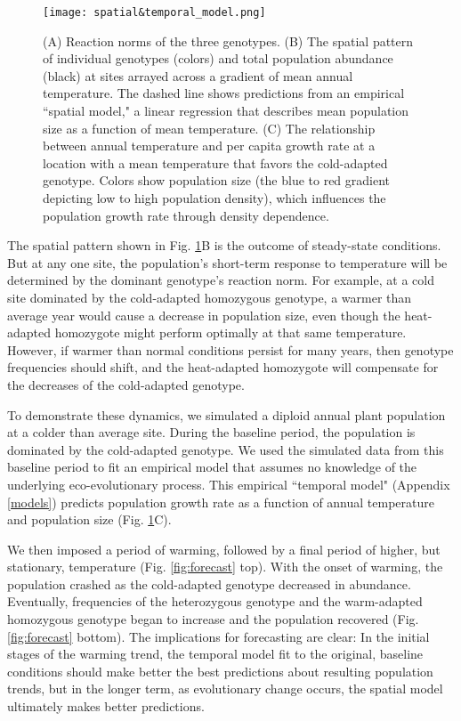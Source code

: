 \documentclass[11pt]{article}
\begin{document}
\begin{figure}[tbp]
\centering
\texttt{[image: spatial\&temporal\_model.png]}
\caption{(A) Reaction norms of the three genotypes. (B) The spatial pattern of individual genotypes (colors) and total population abundance (black) at sites arrayed across a gradient of mean annual temperature. The dashed line shows predictions from an empirical ``spatial model," a linear regression that describes mean population size as a function of mean temperature. (C) The relationship between annual temperature and per capita growth rate at a location with a mean temperature that favors the cold-adapted genotype. Colors show population size (the blue to red gradient depicting low to high population density), which influences the population growth rate through density dependence. }
\label{fig:evo_evo_spatial_temporal_models}
\end{figure}

The spatial pattern shown in Fig. \ref{fig:evo_evo_spatial_temporal_models}B is the outcome of steady-state conditions. But at any one site, the population's short-term response to temperature will be determined by the dominant genotype's reaction norm. For example, at a cold site dominated by the cold-adapted homozygous genotype, a warmer than average year would cause a decrease in population size, even though the heat-adapted homozygote might perform optimally at that same temperature. However, if warmer than normal conditions persist for many years, then genotype frequencies should shift, and the heat-adapted homozygote will compensate for the decreases of the cold-adapted genotype. 

To demonstrate these dynamics, we simulated a diploid annual plant population at a colder than average site. During the baseline period, the population is dominated by the cold-adapted genotype. We used the simulated data from this baseline period to fit an empirical model that assumes no knowledge of the underlying eco-evolutionary process. This empirical ``temporal model" (Appendix \ref{models}) predicts population growth rate as a function of annual temperature and population size (Fig. \ref{fig:evo_evo_spatial_temporal_models}C). 

We then imposed a period of warming, followed by a final period of higher, but stationary, temperature (Fig. \ref{fig:forecast} top). With the onset of warming, the population crashed as the cold-adapted genotype decreased in abundance. Eventually, frequencies of the heterozygous genotype and the warm-adapted homozygous genotype began to increase and the population recovered (Fig. \ref{fig:forecast} bottom). The implications for forecasting are clear: In the initial stages of the warming trend, the temporal model fit to the original, baseline conditions should make better the best predictions about resulting population trends, but in the longer term, as evolutionary change occurs, the spatial model ultimately makes better predictions. 
\end{document}
